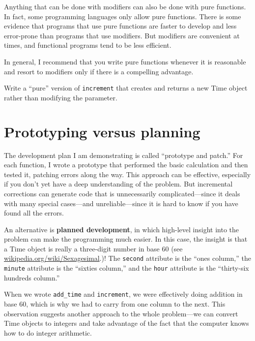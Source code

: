 Anything that can be done with modifiers can also be done with pure
functions.  In fact, some programming languages only allow pure
functions.  There is some evidence that programs that use pure
functions are faster to develop and less error-prone than programs
that use modifiers.  But modifiers are convenient at times,
and functional programs tend to be less efficient.

In general, I recommend that you write pure functions whenever it is
reasonable and resort to modifiers only if there is a compelling
advantage. 


\begin{exercise}
Write a ``pure'' version of {\tt increment} that creates and returns
a new Time object rather than modifying the parameter.
\end{exercise}


\section{Prototyping versus planning}
\label{prototype}


The development plan I am demonstrating is called ``prototype and
patch.''  For each function, I wrote a prototype that performed the
basic calculation and then tested it, patching errors along the
way.
%
This approach can be effective, especially if you don't yet have a
deep understanding of the problem.  But incremental corrections can
generate code that is unnecessarily complicated---since it deals with
many special cases---and unreliable---since it is hard to know if you
have found all the errors.

An alternative is {\bf planned development}, in which high-level
insight into the problem can make the programming much easier.  In
this case, the insight is that a Time object is really a three-digit
number in base 60 (see \url{wikipedia.org/wiki/Sexagesimal}.)!  The
{\tt second} attribute is the ``ones column,'' the {\tt minute}
attribute is the ``sixties column,'' and the {\tt hour} attribute is
the ``thirty-six hundreds column.''


When we wrote \verb"add_time" and {\tt increment}, we were effectively
doing addition in base 60, which is why we had to carry from one
column to the next.
%
%
This observation suggests another approach to the whole problem---we
can convert Time objects to integers and take advantage of the fact
that the computer knows how to do integer arithmetic.  

